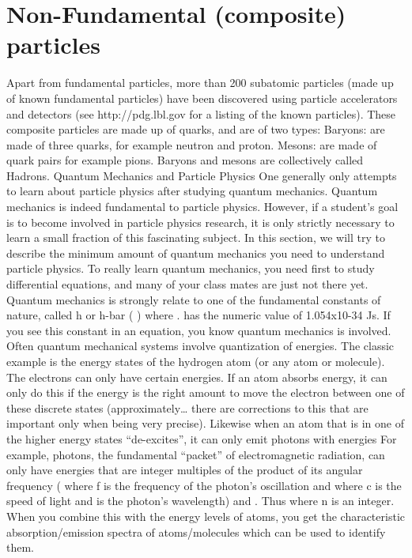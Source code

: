 \section{Non-Fundamental (composite) particles}
Apart from fundamental particles, more than 200 subatomic particles (made up of known fundamental particles) have been discovered using particle accelerators and detectors (see http://pdg.lbl.gov for a listing of the known particles).  These composite particles are made up of quarks, and are of two types:
Baryons: are made of three quarks, for example neutron and proton.
Mesons: are made of quark pairs for example pions.
Baryons and mesons are collectively called Hadrons.
Quantum Mechanics and Particle Physics
One generally only attempts to learn about particle physics after studying quantum mechanics.  Quantum mechanics is indeed fundamental to particle physics.  However, if a student’s goal is to become involved in particle physics research, it is only strictly necessary to learn a small fraction of this fascinating subject.  In this section, we will try to describe the minimum amount of quantum mechanics you need to understand particle physics.  To really learn quantum mechanics, you need first to study differential equations, and many of your class mates are just not there yet.
Quantum mechanics is strongly relate to one of the fundamental constants of nature, called h or h-bar (  ) where  .    has the numeric value of 1.054x10-34 Js.  If you see this constant in an equation, you know quantum mechanics is involved.
Often quantum mechanical systems involve quantization of energies.  The classic example is the energy states of the hydrogen atom (or any atom or molecule).  The electrons can only have certain energies.  If an atom absorbs energy, it can only do this if the energy is the right amount to move the electron between one of these discrete states (approximately… there are corrections to this that are important only when being very precise).  Likewise when an atom that is in one of the higher energy states “de-excites”, it can only emit photons with energies
For example, photons, the fundamental “packet” of electromagnetic radiation, can only have energies that are integer multiples of the product of its angular frequency (  where f is the frequency of the photon’s oscillation and   where c is the speed of light and   is the photon’s wavelength) and .  Thus   where n is an integer.
When you combine this with the energy levels of atoms, you get the characteristic absorption/emission spectra of atoms/molecules which can be used to identify them.
 

